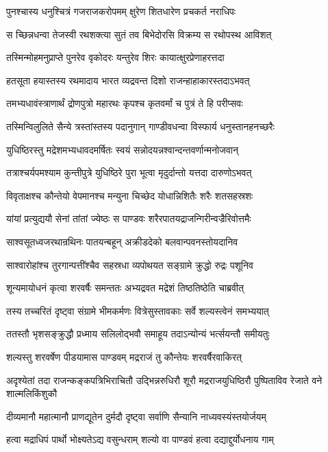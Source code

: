 \twolineshloka
{पुनश्चास्य धनुश्चित्रं गजराजकरोपमम्}
{क्षुरेण शितधारेण प्रचकर्त नराधिपः}


\twolineshloka
{स च्छिन्नधन्वा तेजस्वी रथशक्त्या सुतं तव}
{बिभेदोरसि विक्रम्य स रथोपस्थ आविशत्}


\twolineshloka
{तस्मिन्मोहमनुप्राप्ते पुनरेव वृकोदरः}
{यन्तुरेव शिरः कायात्क्षुरप्रेणाहरत्तदा}


\twolineshloka
{हतसूता हयास्तस्य रथमादाय भारत}
{व्यद्रवन्त दिशो राजन्हाहाकारस्तदाऽभवत्}


\twolineshloka
{तमभ्यधावंस्त्राणार्थं द्रोणपुत्रो महारथः}
{कृपश्च कृतवर्मां च पुत्रं ते हि परीप्सवः}


\twolineshloka
{तस्मिन्विलुलिते सैन्ये त्रस्तांस्तस्य पदानुगान्}
{गाण्डीवधन्वा विस्फार्य धनुस्तानहनच्छरैः}


\twolineshloka
{युधिष्ठिरस्तु मद्रेशमभ्यधावदमर्षितः}
{स्वयं सन्नोदयन्नश्वान्दन्तवर्णान्मनोजवान्}


\twolineshloka
{तत्राश्चर्यपमश्याम कुन्तीपुत्रे युधिष्ठिरे}
{पुरा भूत्वा मृदुर्दान्तो यत्तदा दारुणोऽभवत्}


\twolineshloka
{विवृताक्षश्च कौन्तेयो वेपमानश्च मन्युना}
{चिच्छेद योधान्निशितैः शरैः शतसहस्रशः}


\twolineshloka
{यांयां प्रत्युद्ययौ सेनां तांतां ज्येष्ठः स पाण्डवः}
{शरैरपातयद्राजन्गिरीन्वज्रैरिवोत्तमैः}


\twolineshloka
{साश्वसूतध्वजरथान्रथिनः पातयन्बहून्}
{अक्रीडदेको बलवान्पवनस्तोयदानिव}


\twolineshloka
{साश्वारोहांश्च तुरगान्पत्तींश्चैव सहस्रधा}
{व्यपोथयत सङ्ग्रामे क्रुद्धो रुद्रः पशूनिव}


\twolineshloka
{शून्यमायोधनं कृत्वा शरवर्षैः समन्ततः}
{अभ्यद्रवत मद्रेशं तिष्ठतिष्ठेति चाब्रवीत्}


\twolineshloka
{तस्य तच्चरितं दृष्ट्वा संग्रामे भीमकर्मणः}
{वित्रेसुस्तावकाः सर्वे शल्यस्त्वेनं समभ्ययात्}


\twolineshloka
{ततस्तौ भृशसङ्क्रुद्धौ प्रध्माय सलिलोद्भवौ}
{समाहूय तदाऽन्योन्यं भर्त्सयन्तौ समीयतुः}


\twolineshloka
{शल्यस्तु शरवर्षेण पीडयामास पाण्डवम्}
{मद्रराजं तु कौन्तेयः शरवर्षैरवाकिरत्}


\threelineshloka
{अदृश्येतां तदा राजन्कङ्कपत्रिभिराचितौ}
{उद्भिन्नरुधिरौ शूरौ मद्रराजयुधिष्ठिरौ}
{पुष्पिताविव रेजाते वने शाल्मलिकिंशुकौ}


\twolineshloka
{दीव्यमानौ महात्मानौ प्राणद्यूतेन दुर्मदौ}
{दृष्ट्वा सर्वाणि सैन्यानि नाध्यवस्यंस्तयोर्जयम्}


\twolineshloka
{हत्वा मद्राधिपं पार्थो भोक्ष्यतेऽद्य वसुन्धराम्}
{शल्यो वा पाण्डवं हत्वा दद्याद्दुर्योधनाय गाम्}


